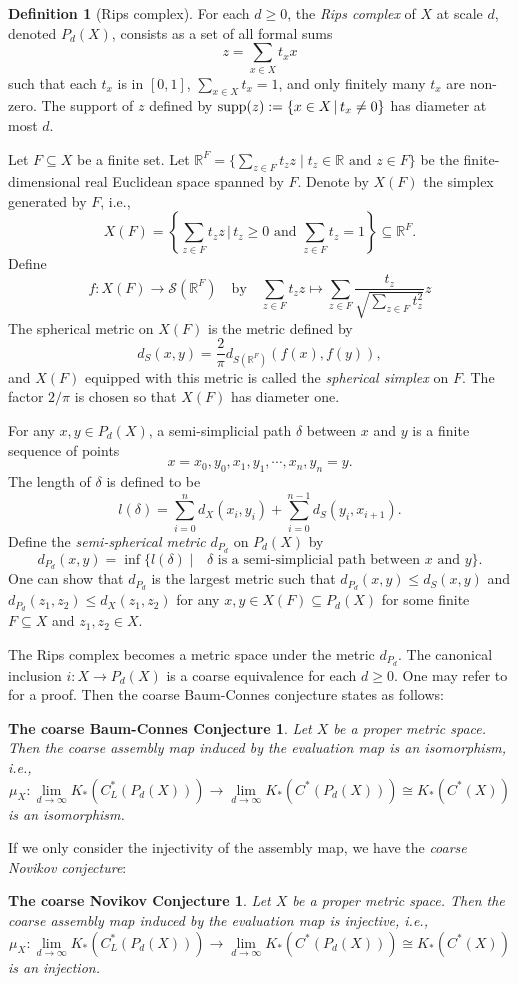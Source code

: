 \documentclass{article}
\newtheorem*{TECNC}{The  coarse Novikov Conjecture}
\newtheorem*{TEBCC}{The  coarse Baum-Connes Conjecture}
\theoremstyle{plain}
\theoremstyle{definition}
\newtheorem{definition}[theorem]{Definition}
\theoremstyle{remark}
\begin{document}
	\begin{definition}[Rips complex]
		For each $d\geq 0$, the \emph{Rips complex} of $X$ at scale $d$, denoted $P_d(X)$, consists as a set of all formal sums
		$$z=\sum_{x\in X}t_xx$$
		such that each $t_x$ is in $[0,1]$, $\sum_{x\in X}t_x=1$, and only finitely many $t_x$ are non-zero. The support of $z$ defined by $\textup{supp}(z):=\{x\in X\,|\,t_x\ne0\}$ has diameter at most $d$.
	\end{definition}
	
	Let $F\subseteq X$ be a finite set. Let $\mathbb{R}^F=\{\sum_{z\in F}t_zz\mid t_z\in\mathbb R\text{ and }z\in F\}$ be the finite-dimensional real Euclidean space spanned by $F$. Denote by $X(F)$ the simplex generated by $F$, i.e.,
	$$X(F)=\left\{\sum_{z\in F}t_zz\,\Big|\,t_z\geq 0\text{ and }\sum_{z\in F}t_z=1\right\}\subseteq \mathbb R^F.$$
	Define 
	$$f:X(F)\to\mathcal{S}(\mathbb{R}^F)\quad\text{by}\quad \sum_{z\in F}t_zz\mapsto\sum_{z\in F}\frac{t_z}{\sqrt{\sum_{z\in F}t^2_z}} z$$
	The spherical metric on $X(F)$ is the metric defined by
	$$d_S(x,y)=\frac{2}{\pi}d_{S(\mathbb R^F)}(f(x),f(y)),$$
	and $X(F)$ equipped with this metric is called the \emph{spherical simplex} on $F$. The factor $2/\pi$ is chosen so that $X(F)$ has diameter one.
	
	For any $x,y\in P_d(X)$, a semi-simplicial path $\delta$ between $x$ and $y$ is a finite sequence of points
	$$x=x_0,y_0,x_1,y_1,\cdots,x_n,y_n=y.$$
	The length of $\delta$ is defined to be
	$$l(\delta)=\sum_{i=0}^{n}d_X(x_i,y_i)+\sum_{i=0}^{n-1}d_S(y_i,x_{i+1}).$$
	Define the \emph{semi-spherical metric} $d_{P_d}$ on $P_d(X)$ by
	$$d_{P_d}(x,y)=\inf\{l(\delta)\mid\text{ $\delta$ is a semi-simplicial path between $x$ and $y$}\}.$$
	One can show that $d_{P_d}$ is the largest metric such that $d_{P_d}(x,y)\leq d_S(x,y)$ and $d_{P_d}(z_1,z_2)\leq d_X(z_1,z_2)$ for any $x,y\in X(F)\subseteq P_d(X)$ for some finite $F\subseteq X$ and $z_1,z_2\in X$.
	
	The Rips complex becomes a metric space under the metric $d_{P_d}$. The canonical inclusion $i: X\to P_d(X)$ is a coarse equivalence for each $d\geq0$. One may refer to \cite[Chapter 7]{willett2020higher} for a proof. Then the coarse Baum-Connes conjecture states as follows:
	\begin{TEBCC}
		Let $X$ be a proper metric space. Then the coarse assembly map induced by the evaluation map is an isomorphism, i.e.,
		$$\mu_X:\lim_{d\to\infty}K_*(C^*_L(P_d(X)))\to\lim_{d\to\infty}K_*(C^*(P_d(X)))\cong K_*(C^*(X))$$
		is an isomorphism.
	\end{TEBCC}
	If we only consider the injectivity of the assembly map, we have the \emph{coarse Novikov conjecture}:
	\begin{TECNC}
		Let $X$ be a proper metric space. Then the coarse assembly map induced by the evaluation map is injective, i.e.,
		$$\mu_X:\lim_{d\to\infty}K_*(C^*_L(P_d(X)))\to\lim_{d\to\infty}K_*(C^*(P_d(X)))\cong K_*(C^*(X))$$
		is an injection.
	\end{TECNC}
\end{document}
